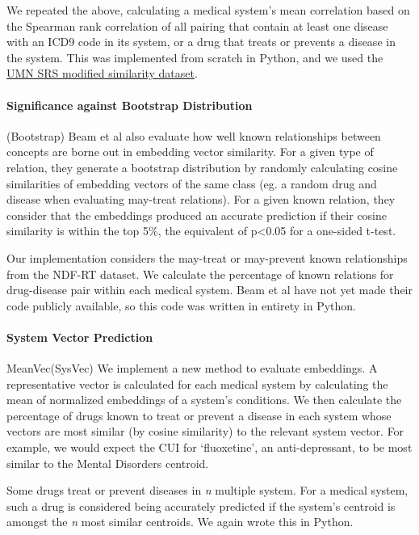 \documentclass[11pt,a4paper]{article}
\begin{document}
We repeated the above, calculating a medical system's mean correlation based on the Spearman rank correlation of all pairing that contain at least one disease with an ICD9 code in its system, or a drug that treats or prevents a disease in the system. This was implemented from scratch in Python, and we used the \href{https://conservancy.umn.edu/handle/11299/196265}{UMN SRS modified similarity dataset}.

\paragraph{Significance against Bootstrap Distribution}(Bootstrap)
Beam et al  also evaluate how well known relationships between concepts are borne out in embedding vector similarity. For a given type of relation, they generate a bootstrap distribution by randomly calculating cosine similarities of embedding vectors of the same class (eg. a random drug and disease when evaluating  may-treat relations). For a given known relation, they consider that the embeddings produced an accurate prediction if their cosine similarity is within the top 5\%, the equivalent of p<0.05 for a one-sided t-test. 

Our implementation considers the may-treat or may-prevent known relationships from the NDF-RT dataset. We calculate the percentage of known relations for drug-disease pair within each medical system. Beam et al have not yet made their code publicly available, so this code was written in entirety in Python. 

\paragraph{System Vector Prediction}{MeanVec}(SysVec)
We implement a new method to evaluate embeddings. A representative vector is calculated for each medical system by calculating the mean of normalized embeddings of a system's conditions. We then calculate the percentage of drugs known to treat or prevent a disease in each system whose vectors are most similar (by cosine similarity) to the relevant system vector. For example, we would expect the CUI for `fluoxetine', an anti-depressant, to be most similar to the Mental Disorders centroid. 

Some drugs treat or prevent diseases in \emph{n} multiple system. For a medical system, such a drug is considered being accurately predicted if the system's centroid is amongst the \emph{n} most similar centroids. We again wrote this in Python. 
\end{document}
